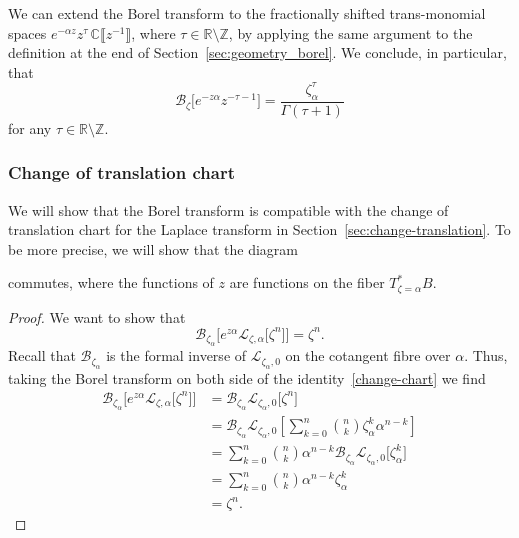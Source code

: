 \documentclass{article}
\newcommand{\Z}{\mathbb{Z}}
\newcommand{\R}{\mathbb{R}}
\newcommand{\C}{\mathbb{C}}
\newcommand{\laplace}{\mathcal{L}}
\newcommand{\borel}{\mathcal{B}}
\theoremstyle{definition}
\theoremstyle{plain}
\begin{document}
We can extend the Borel transform to the fractionally shifted trans-monomial spaces $e^{-\alpha z} z^\tau\,\C\llbracket z^{-1} \rrbracket$, where $\tau \in \R \setminus \Z$, by applying the same argument to the definition at the end of Section~\ref{sec:geometry_borel}. We conclude, in particular, that
\[\borel_{\zeta}\big[e^{-z\alpha}z^{-\tau-1}\big] = \frac{\zeta_\alpha^\tau}{\Gamma(\tau+1)}\]
for any $\tau \in \R\setminus\Z$.

\subsubsection{Change of translation chart}\label{transl-borel}
We will show that the Borel transform is compatible with the change of translation chart for the Laplace transform in Section~\ref{sec:change-translation}. To be more precise, we will show that the diagram
\begin{center}
\end{center}
commutes, where the functions of $z$ are functions on the fiber $T^*_{\zeta=\alpha}B$. 
\begin{proof}
We want to show that 
\[\borel_{\zeta_\alpha}\Big[e^{z\alpha} \laplace_{\zeta,\alpha}\big[\zeta^n\big]\Big]=\zeta^n.\]
Recall that $\borel_{\zeta_\alpha}$
is the formal inverse of $\laplace_{\zeta_\alpha,0}$ on the cotangent fibre over $\alpha$. Thus, taking the Borel transform on both side of the identity~\eqref{change-chart} we find
  \begin{align*}
      \borel_{\zeta_\alpha}\Big[e^{z\alpha} \laplace_{\zeta,\alpha}\big[\zeta^n\big]\Big]&=\borel_{\zeta_\alpha}\laplace_{\zeta_\alpha,0}\big[\zeta^n\big]\\
      &=\borel_{\zeta_\alpha}\laplace_{\zeta_\alpha,0}\left[\sum_{k=0}^n{n\choose k}\zeta_\alpha^k \alpha^{n-k}\right]\\
      &=\sum_{k=0}^n{n\choose k} \alpha^{n-k}\borel_{\zeta_\alpha}\laplace_{\zeta_\alpha,0}\big[\zeta_\alpha^k \big]\\
      &=\sum_{k=0}^n{n\choose k} \alpha^{n-k}\zeta_\alpha^k\\
      &=\zeta^n.
  \end{align*}
\end{proof}
%
\end{document}
